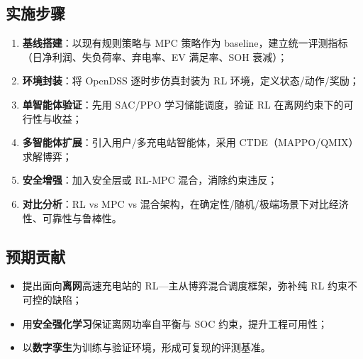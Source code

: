 \documentclass[UTF8,a4paper,11pt]{ctexart}
\begin{document}
\subsection{实施步骤}
\begin{enumerate}
  \item \textbf{基线搭建}：以现有规则策略与 MPC 策略作为 baseline，建立统一评测指标（日净利润、失负荷率、弃电率、EV 满足率、SOH 衰减）；
  \item \textbf{环境封装}：将 OpenDSS 逐时步仿真封装为 RL 环境，定义状态/动作/奖励；
  \item \textbf{单智能体验证}：先用 SAC/PPO 学习储能调度，验证 RL 在离网约束下的可行性与收益；
  \item \textbf{多智能体扩展}：引入用户/多充电站智能体，采用 CTDE（MAPPO/QMIX）求解博弈；
  \item \textbf{安全增强}：加入安全层或 RL-MPC 混合，消除约束违反；
  \item \textbf{对比分析}：RL vs MPC vs 混合架构，在确定性/随机/极端场景下对比经济性、可靠性与鲁棒性。
\end{enumerate}

\subsection{预期贡献}
\begin{itemize}
  \item 提出面向\textbf{离网}高速充电站的 RL—主从博弈混合调度框架，弥补纯 RL 约束不可控的缺陷；
  \item 用\textbf{安全强化学习}保证离网功率自平衡与 SOC 约束，提升工程可用性；
  \item 以\textbf{数字孪生}为训练与验证环境，形成可复现的评测基准。
\end{itemize}
\end{document}
